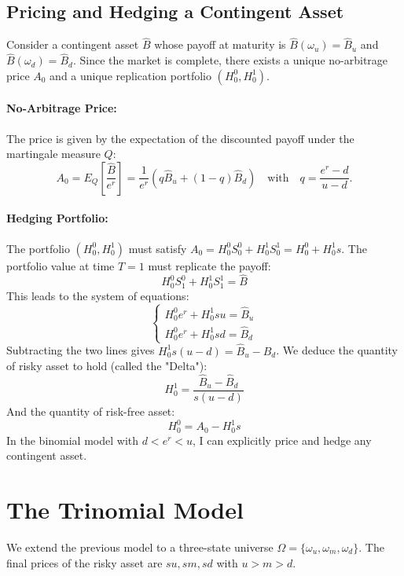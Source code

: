 \subsection{Pricing and Hedging a Contingent Asset}
Consider a contingent asset $\hat{B}$ whose payoff at maturity is $\hat{B}(\omega_u) = \hat{B}_u$ and $\hat{B}(\omega_d) = \hat{B}_d$.
Since the market is complete, there exists a unique no-arbitrage price $A_0$ and a unique replication portfolio $(H_0^0, H_0^1)$.

\paragraph{No-Arbitrage Price:}
The price is given by the expectation of the discounted payoff under the martingale measure $Q$:
\begin{equation}
A_0 = E_Q\left[\frac{\hat{B}}{e^r}\right] = \frac{1}{e^r} \left( q \hat{B}_u + (1-q) \hat{B}_d \right) \quad \text{with} \quad q = \frac{e^r - d}{u - d}.
\end{equation}

\paragraph{Hedging Portfolio:}
The portfolio $(H_0^0, H_0^1)$ must satisfy $A_0 = H_0^0 S_0^0 + H_0^1 S_0^1 = H_0^0 + H_0^1 s$.
The portfolio value at time $T=1$ must replicate the payoff:
\begin{equation}
H_0^0 S_1^0 + H_0^1 S_1^1 = \hat{B}
\end{equation}
This leads to the system of equations:
\begin{equation}
\begin{cases}
    H_0^0 e^r + H_0^1 su = \hat{B}_u \\
    H_0^0 e^r + H_0^1 sd = \hat{B}_d
\end{cases}
\end{equation}
Subtracting the two lines gives $H_0^1 s(u-d) = \hat{B}_u - \hat{B}_d$. We deduce the quantity of risky asset to hold (called the "Delta"):
\begin{equation}
H_0^1 = \frac{\hat{B}_u - \hat{B}_d}{s(u-d)}
\end{equation}
And the quantity of risk-free asset:
\begin{equation}
H_0^0 = A_0 - H_0^1 s
\end{equation}
In the binomial model with $d < e^r < u$, I can explicitly price and hedge any contingent asset.

\section{The Trinomial Model}
We extend the previous model to a three-state universe $\Omega = \{\omega_u, \omega_m, \omega_d\}$. The final prices of the risky asset are $su, sm, sd$ with $u > m > d$.

